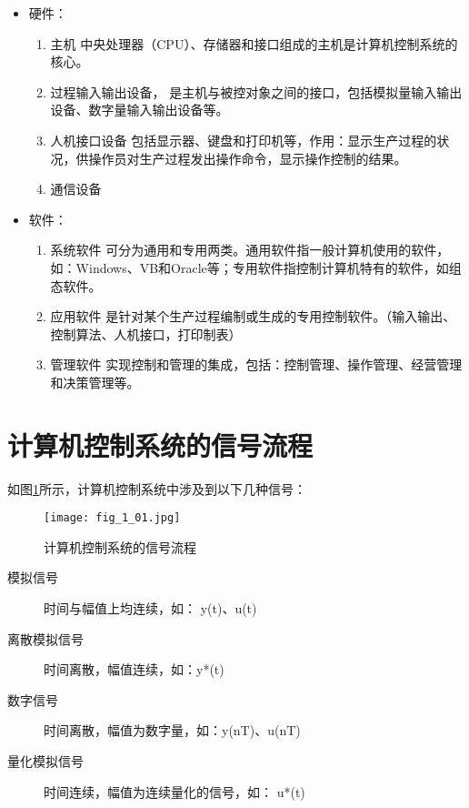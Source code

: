 \begin{itemize}
  \item 硬件：
  \begin{enumerate}
    \item 主机
    中央处理器（CPU）、存储器和接口组成的主机是计算机控制系统的核心。
    \item 过程输入输出设备，
   是主机与被控对象之间的接口，包括模拟量输入输出设备、数字量输入输出设备等。
    \item 人机接口设备
    包括显示器、键盘和打印机等，作用：显示生产过程的状况，供操作员对生产过程发出操作命令，显示操作控制的结果。
    \item 通信设备
  \end{enumerate}


  \item 软件：
  \begin{enumerate}
    \item 系统软件
    可分为通用和专用两类。通用软件指一般计算机使用的软件，如：Windows、VB和Oracle等；专用软件指控制计算机特有的软件，如组态软件。
    \item 应用软件
   是针对某个生产过程编制或生成的专用控制软件。（输入输出、控制算法、人机接口，打印制表）
    \item 管理软件
    实现控制和管理的集成，包括：控制管理、操作管理、经营管理和决策管理等。
  \end{enumerate}

\end{itemize}








\section{计算机控制系统的信号流程}

如图\ref{fig_1_01}所示，计算机控制系统中涉及到以下几种信号：

\begin{figure}[h]
  \centering
  \texttt{[image: fig\_1\_01.jpg]}\\
  \caption{计算机控制系统的信号流程}\label{fig_1_01}
\end{figure}


\begin{description}
  \item[模拟信号] 时间与幅值上均连续，如： y(t)、u(t)
  \item[离散模拟信号] 时间离散，幅值连续，如：y*(t)
  \item[数字信号] 时间离散，幅值为数字量，如：y(nT)、u(nT)
  \item[量化模拟信号] 时间连续，幅值为连续量化的信号，如： u*(t)
\end{description}


